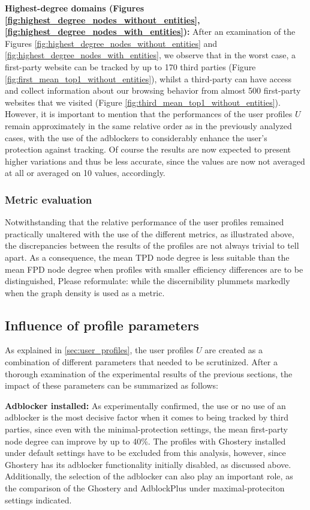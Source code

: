 \documentclass{sig-alternate}
\begin{document}
\textbf{Highest-degree domains (Figures \ref{fig:highest_degree_nodes_without_entities}, \ref{fig:highest_degree_nodes_with_entities}):} After an examination of the Figures \ref{fig:highest_degree_nodes_without_entities} and \ref{fig:highest_degree_nodes_with_entities}, we observe that in the worst case, a first-party website can be tracked by up to 170 third parties (Figure \ref{fig:first_mean_top1_without_entities}), whilst a third-party can have access and collect information about our browsing behavior from almost 500 first-party websites that we visited (Figure \ref{fig:third_mean_top1_without_entities}). However, it is important to mention that the performances of the user profiles $U$ remain approximately in the same relative order as in the previously analyzed cases, with the use of the adblockers to considerably enhance the user's protection against tracking. Of course the results are now expected to present higher variations and thus be less accurate, since the values are now not averaged at all or averaged on 10 values, accordingly.

\subsubsection{Metric evaluation}
Notwithstanding that the relative performance of the user profiles remained practically unaltered with the use of the different metrics, as illustrated above, the discrepancies between the results of the profiles are not always trivial to tell apart. As a consequence, the mean TPD node degree is less suitable than the mean FPD node degree when profiles with smaller efficiency differences are to be distinguished, {\color{red}Please reformulate: while the discernibility plummets markedly when the graph density is used as a metric}.


\subsection{Influence of profile parameters}
As explained in \ref{sec:user_profiles}, the user profiles $U$ are created as a combination of different parameters that needed to be scrutinized. After a thorough examination of the experimental results of the previous sections, the impact of these parameters can be summarized as follows:

\textbf{Adblocker installed:} As experimentally confirmed, the use or no use of an adblocker is the most decisive factor when it comes to being tracked by third parties, since even with the minimal-protection settings, the mean first-party node degree can improve by up to 40\%. The profiles with Ghostery installed under default settings have to be excluded from this analysis, however, since Ghostery has its adblocker functionality initially disabled, as discussed above. Additionally, the selection of the adblocker can also play an important role, as the comparison of the Ghostery and AdblockPlus under maximal-proteciton settings indicated.
\end{document}
